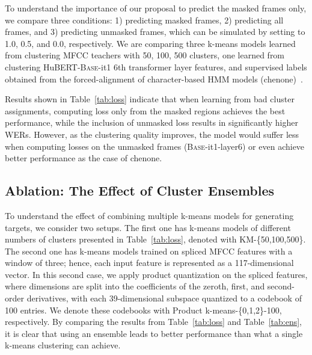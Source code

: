 To understand the importance of our proposal to predict the masked frames only, we compare three conditions: 1) predicting masked frames, 2) predicting all frames, and 3) predicting unmasked frames, which can be simulated by setting  to 1.0, 0.5, and 0.0, respectively. 
We are comparing three k-means models learned from clustering MFCC teachers with 50, 100, 500 clusters, one learned from clustering HuBERT-\textsc{Base}-it1 6th transformer layer features, and supervised labels obtained from the forced-alignment of character-based HMM models (chenone)~\cite{le2019senones}.

Results shown in Table~\ref{tab:loss} indicate that when learning from bad cluster assignments, computing loss only from the masked regions achieves the best performance, while the inclusion of unmasked loss results in significantly higher WERs. 
However, as the clustering quality improves, the model would suffer less when computing losses on the unmasked frames (\textsc{Base}-it1-layer6) or even achieve better performance as the case of chenone.


\subsection{Ablation: The Effect of Cluster Ensembles}
To understand the effect of combining multiple k-means models for generating targets, we consider two setups. The first one has k-means models of different numbers of clusters presented in Table~\ref{tab:loss}, denoted with KM-\{50,100,500\}. The second one has k-means models trained on spliced MFCC features with a window of three; hence, each input feature is represented as a 117-dimensional vector. In this second case, we apply product quantization on the spliced features, where dimensions are split into the coefficients of the zeroth, first, and second-order derivatives, with each 39-dimensional subspace quantized to a codebook of 100 entries. We denote these codebooks with Product k-means-\{0,1,2\}-100, respectively.
By comparing the results from Table~\ref{tab:loss} and Table~\ref{tab:ens}, it is clear that using an ensemble leads to better performance than what a single k-means clustering can achieve.


